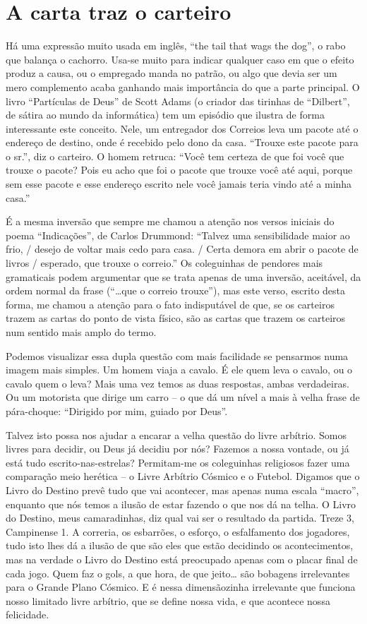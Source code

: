 \chapter{A carta traz o carteiro}

Há uma expressão muito usada em inglês, “the tail that wags the dog”,
o rabo que balança o cachorro. Usa-se muito para indicar qualquer
caso em que o efeito produz a causa, ou o empregado manda no patrão,
ou algo que devia ser um mero complemento acaba ganhando mais
importância do que a parte principal. O livro “Partículas de Deus” de
Scott Adams (o criador das tirinhas de “Dilbert”, de sátira ao mundo
da informática) tem um episódio que ilustra de forma interessante
este conceito. Nele, um entregador dos Correios leva um pacote até o
endereço de destino, onde é recebido pelo dono da casa. “Trouxe este
pacote para o sr.”, diz o carteiro. O homem retruca: “Você tem
certeza de que foi você que trouxe o pacote? Pois eu acho que foi o
pacote que trouxe você até aqui, porque sem esse pacote e esse
endereço escrito nele você jamais teria vindo até a minha casa.”

É a mesma inversão que sempre me chamou a atenção nos versos iniciais
do poema “Indicações”, de Carlos Drummond: “Talvez uma sensibilidade
maior ao frio, / desejo de voltar mais cedo para casa. / Certa demora
em abrir o pacote de livros / esperado, que trouxe o correio.” Os
coleguinhas de pendores mais gramaticais podem argumentar que se
trata apenas de uma inversão, aceitável, da ordem normal da frase
(“…que o correio trouxe”), mas este verso, escrito desta forma, me
chamou a atenção para o fato indisputável de que, se os carteiros
trazem as cartas do ponto de vista físico, são as cartas que trazem
os carteiros num sentido mais amplo do termo.

Podemos visualizar essa dupla questão com mais facilidade se pensarmos
numa imagem mais simples. Um homem viaja a cavalo. É ele quem leva o
cavalo, ou o cavalo quem o leva? Mais uma vez temos as duas
respostas, ambas verdadeiras. Ou um motorista que dirige um carro -- o
que dá um nível a mais à velha frase de pára-choque: “Dirigido por
mim, guiado por Deus”.

Talvez isto possa nos ajudar a encarar a velha questão do livre
arbítrio. Somos livres para decidir, ou Deus já decidiu por nós?
Fazemos a nossa vontade, ou já está tudo escrito-nas-estrelas?
Permitam-me os coleguinhas religiosos fazer uma comparação meio
herética -- o Livre Arbítrio Cósmico e o Futebol. Digamos que o Livro
do Destino prevê tudo que vai acontecer, mas apenas numa
escala “macro”, enquanto que nós temos a ilusão de estar fazendo o que
nos dá na telha. O Livro do Destino, meus camaradinhas, diz qual vai
ser o resultado da partida. Treze 3, Campinense 1.  A correria, os
esbarrões, o esforço, o esfalfamento dos jogadores, tudo isto lhes dá
a ilusão de que são eles que estão decidindo os acontecimentos, mas
na verdade o Livro do Destino está preocupado apenas com o placar
final de cada jogo. Quem faz o gols, a que hora, de que jeito… são
bobagens irrelevantes para o Grande Plano Cósmico. E é nessa
dimensãozinha irrelevante que funciona nosso limitado livre arbítrio,
que se define nossa vida, e que acontece nossa felicidade.

